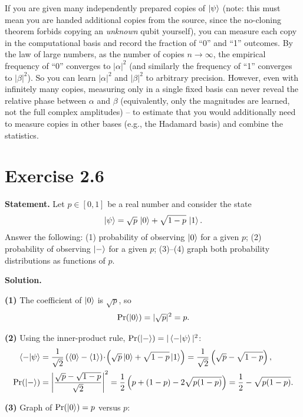 \documentclass[11pt]{article}
\begin{document}
If you are given many independently prepared copies of $\ket{\psi}$ (note: this must mean you are handed additional copies from the source, since the no-cloning theorem forbids copying an \emph{unknown} qubit yourself), you can measure each copy in the computational basis and record the fraction of ``0'' and ``1'' outcomes. By the law of large numbers, as the number of copies $n \to \infty$, the empirical frequency of ``0'' converges to $|\alpha|^2$ (and similarly the frequency of ``1'' converges to $|\beta|^2$). So you can learn $|\alpha|^2$ and $|\beta|^2$ to arbitrary precision. However, even with infinitely many copies, measuring only in a single fixed basis can never reveal the relative phase between $\alpha$ and $\beta$ (equivalently, only the magnitudes are learned, not the full complex amplitudes) -- to estimate that you would additionally need to measure copies in other bases (e.g., the Hadamard basis) and combine the statistics.

\section*{Exercise 2.6}
\textbf{Statement.} Let $p \in [0,1]$ be a real number and consider the state
\[
\ket{\psi} = \sqrt{p}\,\ket{0} + \sqrt{1-p}\,\ket{1}.
\]
Answer the following: (1) probability of observing $\ket{0}$ for a given $p$; (2) probability of observing $\ket{-}$ for a given $p$; (3)--(4) graph both probability distributions as functions of $p$.

\textbf{Solution.}

\textbf{(1)} The coefficient of $\ket{0}$ is $\sqrt{p}$, so
\[
\Pr(\ket{0}) = |\sqrt{p}|^2 = p.
\]

\textbf{(2)} Using the inner-product rule, $\Pr(\ket{-}) = |\braket{-|\psi}|^2$:
\begin{align*}
\braket{-|\psi} &= \frac{1}{\sqrt{2}}\left(\braket{0} - \braket{1}\right)\!\cdot\!\left(\sqrt{p}\ket{0} + \sqrt{1-p}\ket{1}\right) = \frac{1}{\sqrt{2}}\left(\sqrt{p} - \sqrt{1-p}\right), \\
\Pr(\ket{-}) &= \left|\frac{\sqrt{p} - \sqrt{1-p}}{\sqrt{2}}\right|^2 = \frac{1}{2}\left(p + (1-p) - 2\sqrt{p(1-p)}\right) = \frac{1}{2} - \sqrt{p(1-p)}.
\end{align*}

\textbf{(3)} Graph of $\Pr(\ket{0}) = p$ versus $p$:
\begin{center}
\end{center}
\end{document}
